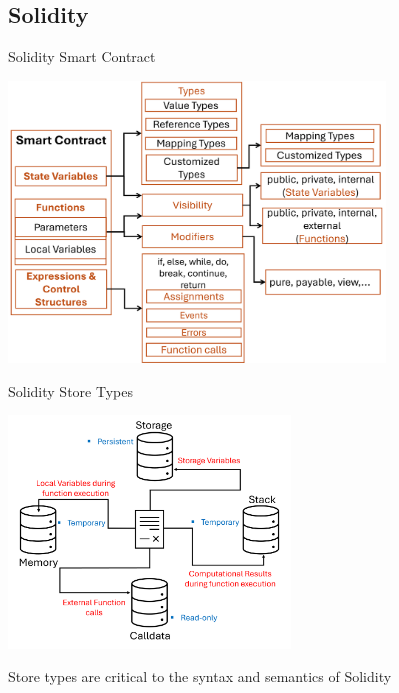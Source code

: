 \documentclass[aspectratio=169]{beamer}
\begin{document}
\subsection{Solidity}
\begin{frame}{Solidity Smart Contract}
	\begin{center}
	\includegraphics[width=10cm,keepaspectratio]{solidityl.PNG}
	\end{center}
\end{frame}
%
\begin{frame}{Solidity Store Types}
	\begin{center}
	\includegraphics[width=7.5cm,keepaspectratio]{datatypes.PNG}
	\end{center}
\begin{exampleblock}{}
  {\large \begin{center}Store types are critical to the syntax and semantics of Solidity\end{center}}
\end{exampleblock}
\end{frame}
%
\end{document}
